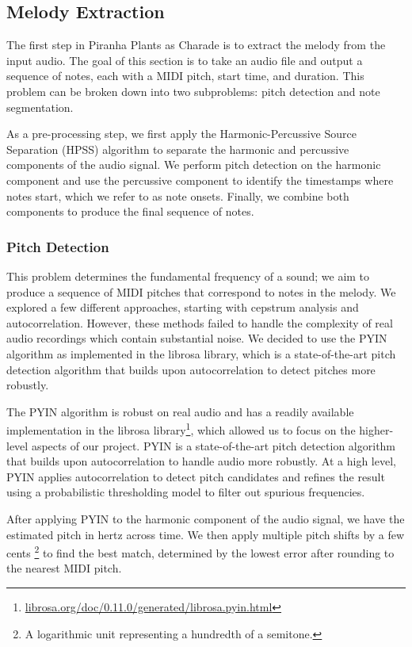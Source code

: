 \subsection{Melody Extraction}
\label{sec:melody_extraction}

The first step in Piranha Plants as Charade is to extract the melody from the input audio. The goal of this section is to take an audio file and output a sequence of notes, each with a MIDI pitch, start time, and duration. This problem can be broken down into two subproblems: pitch detection and note segmentation.

As a pre-processing step, we first apply the Harmonic-Percussive Source Separation (HPSS) algorithm \autocite{HPSS:2010,HPSS:2014} to separate the harmonic and percussive components of the audio signal. We perform pitch detection on the harmonic component and use the percussive component to identify the timestamps where notes start, which we refer to as note onsets. Finally, we combine both components to produce the final sequence of notes.

\subsubsection{Pitch Detection}

This problem determines the fundamental frequency of a sound; we aim to produce a sequence of MIDI pitches that correspond to notes in the melody. We explored a few different approaches, starting with cepstrum analysis and autocorrelation. However, these methods failed to handle the complexity of real audio recordings which contain substantial noise. We decided to use the PYIN algorithm as implemented in the librosa library, which is a state-of-the-art pitch detection algorithm that builds upon autocorrelation to detect pitches more robustly.

The PYIN algorithm \autocite{PYIN:2014} is robust on real audio and has a readily available implementation in the librosa library\footnote{\href{https://librosa.org/doc/0.11.0/generated/librosa.pyin.html}{librosa.org/doc/0.11.0/generated/librosa.pyin.html}}, which allowed us to focus on the higher-level aspects of our project. PYIN is a state-of-the-art pitch detection algorithm that builds upon autocorrelation to handle audio more robustly. At a high level, PYIN applies autocorrelation to detect pitch candidates and refines the result using a probabilistic thresholding model to filter out spurious frequencies.

After applying PYIN to the harmonic component of the audio signal, we have the estimated pitch in hertz across time. We then apply multiple pitch shifts by a few cents \footnote{A logarithmic unit representing a hundredth of a semitone.} to find the best match, determined by the lowest error after rounding to the nearest MIDI pitch.

